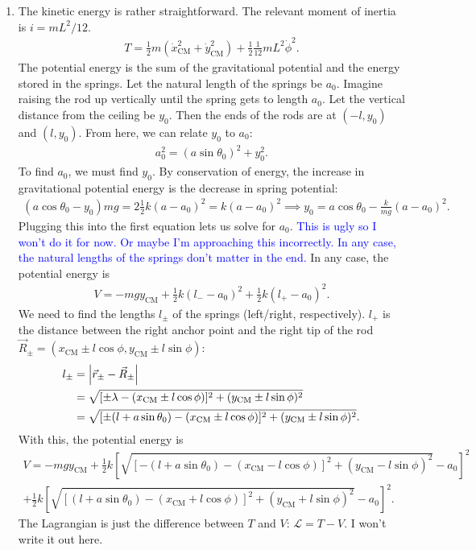 \documentclass{article}
\theoremstyle{definition}
\newcommand{\lag}{\mathcal{L}}
\newcommand{\f}[2]{\frac{#1}{#2}}
\newcommand{\lb}{\left[}
\newcommand{\rb}{\right]}
\begin{document}
\begin{enumerate}[label=(\alph*)]
	\item
	
	
	
	
	
	
	The kinetic energy is rather straightforward. The relevant moment of inertia is $i = mL^2/12$.
	\begin{align*}
	T = \f{1}{2}m (\dot{x}_\text{CM}^2 + \dot{y}_\text{CM}^2) + \f{1}{2}\f{1}{12}mL^2\dot\phi^2.
	\end{align*}
	The potential energy is the sum of the gravitational potential and the energy stored in the springs. Let the natural length of the springs be $a_0$. Imagine raising the rod up vertically until the spring gets to length $a_0$. Let the vertical distance from the ceiling be $y_0$. Then the ends of the rods are at $(-l,y_0)$ and $(l,y_0)$. From here, we can relate $y_0$ to $a_0$:
	\begin{align*}
	a_0^2 = (a\sin\theta_0)^2 + y_0^2.
	\end{align*}
	To find $a_0$, we must find $y_0$. By conservation of energy, the increase in gravitational potential energy is the decrease in spring potential:
	\begin{align*}
	(a\cos\theta_0 - y_0)mg = 2\f{1}{2}k(a - a_0)^2 = k(a-a_0)^2 \implies y_0 = a\cos\theta_0 - \f{k}{mg}(a-a_0)^2.
	\end{align*}
	Plugging this into the first equation lets us solve for $a_0$. \textcolor{blue}{This is ugly so I won't do it for now. Or maybe I'm approaching this incorrectly. In any case, the natural lengths of the springs don't matter in the end.} In any case, the potential energy is 
	\begin{align*}
	V = -mgy_\text{CM} + \f{1}{2}k(l_- -a_0)^2 + \f{1}{2}k(l_+-a_0)^2.
	\end{align*}
	We need to find the lengths $l_\pm$ of the springs (left/right, respectively). $l_+$ is the distance between the right anchor point and the right tip of the rod $\vec{R}_\pm = (x_\text{CM} \pm l\cos\phi, y_\text{CM}\pm l\sin\phi)$:
	\begin{align*}
	l_\pm 
	&= \abs{\vec{r}_\pm - \vec{R}_\pm }\\
	&= \sqrt{[\pm \lambda - (x_\text{CM} \pm l\cos\phi)]^2 + (y_\text{CM} \pm l\sin\phi)^2}\\
	&= \sqrt{[\pm (l+a\sin\theta_0) - (x_\text{CM} \pm l\cos\phi)]^2 + (y_\text{CM}\pm l\sin\phi)^2}.
	\end{align*}
	With this, the potential energy is 
	\begin{align*}
	V = -mgy_\text{CM} + \f{1}{2}k\lb \sqrt{[- (l+a\sin\theta_0) - (x_\text{CM} - l\cos\phi)]^2 + (y_\text{CM}- l\sin\phi)^2} -a_0\rb^2 \\
	+ \f{1}{2}k\lb 
	\sqrt{[(l+a\sin\theta_0) - (x_\text{CM} + l\cos\phi)]^2 + (y_\text{CM}+ l\sin\phi)^2}   -a_0\rb^2.
	\end{align*}
	The Lagrangian is just the difference between $T$ and $V$: $\lag = T-V$. I won't write it out here. 
	

\end{enumerate}
\end{document}
